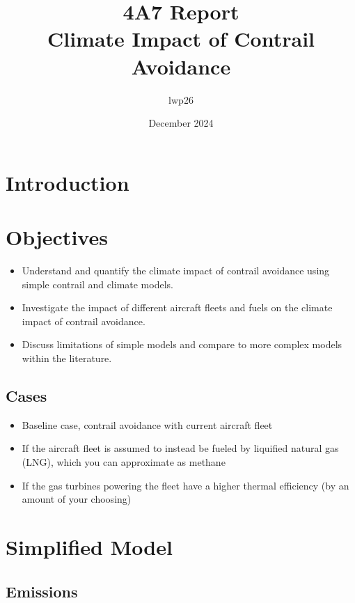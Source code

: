 \documentclass{article}
\begin{document}
\title{4A7 Report \\ Climate Impact of Contrail Avoidance}
\author{lwp26}
\date{December 2024}
\maketitle

\section{Introduction}

\section{Objectives}

\begin{itemize}
    \item Understand and quantify the climate impact of contrail avoidance using simple contrail and climate models.
    \item Investigate the impact of different aircraft fleets and fuels on the climate impact of contrail avoidance.
    \item Discuss limitations of simple models and compare to more complex models within the literature.
\end{itemize}

\subsection{Cases}

\begin{itemize}
    \item Baseline case, contrail avoidance with current aircraft fleet
    \item If the aircraft fleet is assumed to instead be fueled by liquified natural gas (LNG), which you can approximate as methane
    \item If the gas turbines powering the fleet have a higher thermal efficiency (by an amount of your choosing) 
\end{itemize}

\section{Simplified Model}

\subsection{Emissions}
\end{document}
